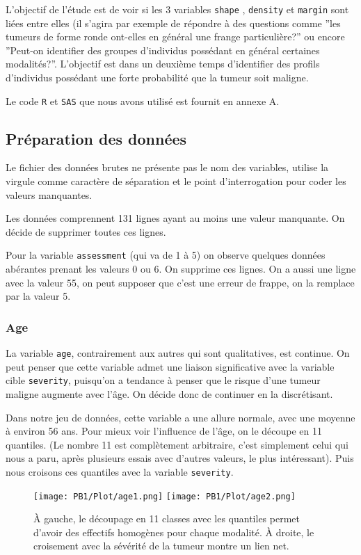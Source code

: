 \documentclass[a4paper]{report}
\begin{document}
L'objectif de l'étude est de voir si les 3 variables \verb|shape| , \verb|density| et \verb|margin| sont liées entre elles (il s'agira par exemple de répondre à des questions comme ''les tumeurs de forme ronde ont-elles en général une frange particulière?'' ou encore ''Peut-on identifier des groupes d'individus possédant en général certaines modalités?''. L'objectif est dans un deuxième temps d'identifier des profils d'individus possédant une forte probabilité que la tumeur soit maligne. 

Le code \verb|R| et \verb|SAS| que nous avons utilisé est fournit en annexe A.

\subsection{Préparation des données}
Le fichier des données brutes ne présente pas le nom des variables, utilise la virgule comme caractère de séparation et le point d'interrogation pour coder les valeurs manquantes. 

Les données comprennent 131 lignes ayant au moins une valeur manquante. On décide de supprimer toutes ces lignes.

Pour la variable \verb|assessment| (qui va de 1 à 5) on observe quelques données abérantes prenant les valeurs 0 ou 6. On supprime ces lignes. On a aussi une ligne avec la valeur 55, on peut supposer que c'est une erreur de frappe, on la remplace par la valeur 5.

\subsubsection{Age}

La variable \verb|age|, contrairement aux autres qui sont qualitatives, est continue. On peut penser que cette variable admet une liaison significative avec la variable cible \verb|severity|, puisqu'on a tendance à penser que le risque d'une tumeur maligne augmente avec l'âge. On décide donc de continuer en la discrétisant.

Dans notre jeu de données, cette variable a une allure normale, avec une moyenne à environ 56 ans. Pour mieux voir l'influence de l'âge, on le découpe en 11 quantiles. (Le nombre 11 est complètement arbitraire, c'est simplement celui qui nous a paru, après plusieurs essais avec d'autres valeurs, le plus intéressant). Puis nous croisons ces quantiles avec la variable \verb|severity|. 

\begin{figure}[!ht]
	\centering
     	\texttt{[image: PB1/Plot/age1.png]} 
       	\texttt{[image: PB1/Plot/age2.png]} 
       	\caption{À gauche, le découpage en 11 classes avec les quantiles permet d'avoir des effectifs homogènes pour chaque modalité. À droite, le croisement avec la sévérité de la tumeur montre un lien net.} 
\end{figure}
\end{document}
